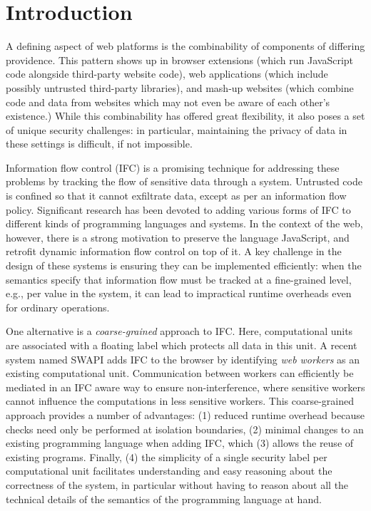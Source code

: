 \section{Introduction}
\label{sec:intro}

A defining aspect of web platforms is the combinability of
components of differing providence.  This pattern shows up in browser
extensions (which run JavaScript code alongside third-party website
code), web applications (which include possibly untrusted third-party
libraries), and mash-up websites (which combine code and data from
websites which may not even be aware of each other's existence.)  While
this combinability has offered great flexibility, it also poses a set of
unique security challenges: in particular, maintaining the privacy of
data in these settings is difficult, if not impossible.

Information flow control (IFC) is a promising technique for addressing these
problems by tracking the flow of sensitive data through a system. Untrusted
code is confined so that it cannot exfiltrate data, except as
per an information flow policy.  Significant research has been devoted to
adding various forms of IFC to different kinds of programming languages
and systems.  In the context of the web, however, there is a strong
motivation to preserve the language JavaScript, and retrofit dynamic information
flow control on top of it.  A key challenge in the design of these
systems is ensuring they can be implemented efficiently: when the
semantics specify that information flow must be tracked at a
fine-grained level, e.g., per value in the system,  it can lead to
impractical runtime overheads even for ordinary operations.

One alternative is a \textit{coarse-grained} approach to IFC.  Here,
computational units are associated with a floating label which protects
all data in this unit.  A recent system named SWAPI adds IFC to the
browser by identifying \emph{web workers} as an existing computational
unit.  Communication between workers can efficiently be mediated in an
IFC aware way to ensure non-interference, where sensitive workers cannot
influence the computations in less sensitive workers.
This coarse-grained approach provides a number
of advantages: (1) reduced runtime overhead because checks need only
be performed at isolation boundaries, (2) minimal changes to an
existing programming language when adding IFC, which (3) allows
the reuse of existing programs.  Finally, (4) the simplicity
of a single security label per computational unit facilitates
understanding and easy reasoning about the correctness of the
system, in particular without having to reason about all the
technical details of the semantics of the programming language
at hand.

